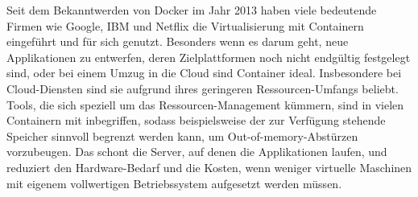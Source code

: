 Seit dem Bekanntwerden von Docker im Jahr 2013 haben viele bedeutende Firmen wie Google, IBM und Netflix die Virtualisierung mit Containern eingeführt und für sich genutzt. 
Besonders wenn es darum geht, neue Applikationen zu entwerfen, deren Zielplattformen noch nicht endgültig festgelegt sind, oder bei einem Umzug in die Cloud sind Container ideal.
Insbesondere bei Cloud-Diensten sind sie aufgrund ihres geringeren Ressourcen-Umfangs beliebt.
Tools, die sich speziell um das Ressourcen-Management kümmern, sind in vielen Containern mit inbegriffen, sodass beispielsweise der zur Verfügung stehende Speicher sinnvoll begrenzt werden kann, um Out-of-memory-Abstürzen vorzubeugen. 
Das schont die Server, auf denen die Applikationen laufen, und reduziert den Hardware-Bedarf und die Kosten, wenn weniger virtuelle Maschinen mit eigenem vollwertigen Betriebssystem aufgesetzt werden müssen.
